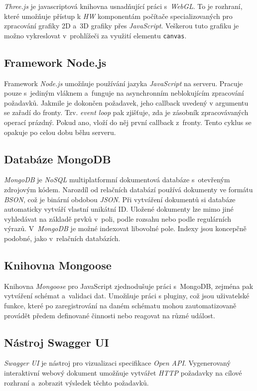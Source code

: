 \documentclass[a4paper,12pt]{article}
\def\code#1{\texttt{#1}}
\begin{document}
\textit{Three.js} je javascriptová knihovna usnadňující práci s~\textit{WebGL}. To je rozhraní, které umožňuje přístup k \textit{HW} komponentám počítače specializovaných pro zpracování grafiky 2D a~3D grafiky přes \textit{JavaScript}. Veškerou tuto grafiku je možno vykreslovat v~prohlížeči za využití elementu \code{canvas}.~\cite{graphic}

\subsection{Framework Node.js}

Framework \textit{Node.js} umožňuje používání jazyka \textit{JavaScript} na serveru. Pracuje pouze s~jediným vláknem a~funguje na asynchronním neblokujícím zpracování požadavků. Jakmile je dokončen požadavek, jeho callback uvedený v argumentu se zařadí do fronty.  Tzv. \textit{event loop} pak zjišťuje, zda je zásobník zpracovávaných operací prázdný. Pokud ano, vloží do něj první callback z~fronty. Tento cyklus se opakuje po celou dobu běhu serveru.~\cite{node}

\subsection{Databáze MongoDB}

\textit{MongoDB} je \textit{NoSQL} multiplatformní dokumentová databáze s~otevřeným zdrojovým kódem. Narozdíl od relačních databází používá dokumenty ve formátu \textit{BSON}, což je binární obdobou \textit{JSON}. Při vytváření dokumentů si databáze automaticky vytváří vlastní unikátní ID.  Uložené dokumenty lze mimo jiné vyhledávat na základě prvků v~poli, podle rozsahu nebo podle regulárních výrazů. V~\textit{MongoDB} je možné indexovat libovolné pole. Indexy jsou koncepčně podobné, jako v~relačních databázích.~\cite{mongomongoose}

\subsection{Knihovna Mongoose}
Knihovna \textit{Mongoose} pro JavaScript zjednodušuje práci s~MongoDB, zejména pak vytváření schémat a~validaci dat. Umožňuje práci s pluginy, což jsou uživatelské funkce, které po zaregistrování na daném schématu mohou zautomatizovaně provádět předem definované činnosti nebo reagovat na různé událost.~\cite{mongomongoose}

\subsection{Nástroj Swagger UI}
\textit{Swagger UI} je nástroj pro vizualizaci specifikace \textit{Open API}. Vygenerovaný interaktivní webový dokument umožňuje vytvářet \textit{HTTP} požadavky na cílové rozhraní a~zobrazit výsledek těchto požadavků.~\cite{swaggerui}
\end{document}
